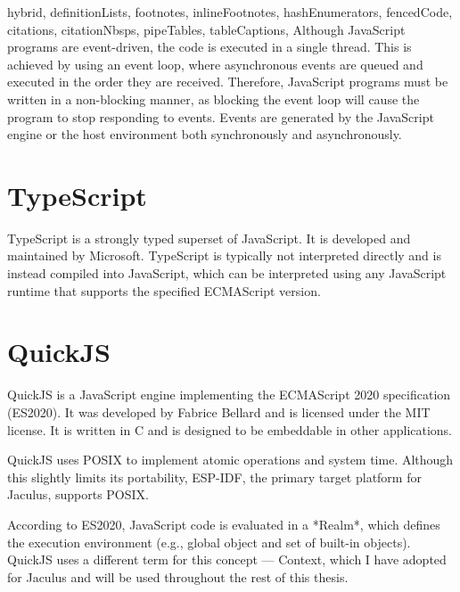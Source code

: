 \begin{markdown*}{%
  hybrid,
  definitionLists,
  footnotes,
  inlineFootnotes,
  hashEnumerators,
  fencedCode,
  citations,
  citationNbsps,
  pipeTables,
  tableCaptions,
}
Although JavaScript programs are event-driven, the code is executed in a single thread. This is achieved by using an event loop, where asynchronous events are queued and executed in the order they are received. Therefore, JavaScript programs must be written in a non-blocking manner, as blocking the event loop will cause the program to stop responding to events. Events are generated by the JavaScript engine or the host environment both synchronously and asynchronously.

\section{TypeScript}

TypeScript is a strongly typed superset of JavaScript. It is developed and maintained by Microsoft. TypeScript is typically not interpreted directly and is instead compiled into JavaScript, which can be interpreted using any JavaScript runtime that supports the specified ECMAScript version.

\section{QuickJS}

QuickJS\cite{quickjs} is a JavaScript engine implementing the ECMAScript 2020 specification\cite{es2020} (ES2020). It was developed by Fabrice Bellard and is licensed under the MIT license. It is written in C and is designed to be embeddable in other applications.

QuickJS uses POSIX to implement atomic operations and system time. Although this slightly limits its portability, ESP-IDF, the primary target platform for Jaculus, supports POSIX.

According to ES2020, JavaScript code is evaluated in a *Realm*, which defines the execution environment (e.g., global object and set of built-in objects). QuickJS uses a different term for this concept --- Context, which I have adopted for Jaculus and will be used throughout the rest of this thesis.


\end{markdown*}
